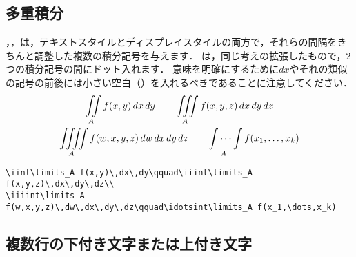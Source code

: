\subsection{多重積分}

，，は，テキストスタイルとディスプレイスタイルの両方で，それらの間隔をきちんと調整した複数の積分記号を与えます．
は，同じ考えの拡張したもので，2つの積分記号の間にドット入れます．
意味を明確にするために$dx$やそれの類似の記号の前後には小さい空白（\cn{,}）を入れるべきであることに注意してください．
\begin{gather}
\iint\limits_A f(x,y)\,dx\,dy\qquad\iiint\limits_A
f(x,y,z)\,dx\,dy\,dz\\
\iiiint\limits_A
f(w,x,y,z)\,dw\,dx\,dy\,dz\qquad\idotsint\limits_A f(x_1,\dots,x_k)
\end{gather}
\begin{verbatim}
\iint\limits_A f(x,y)\,dx\,dy\qquad\iiint\limits_A
f(x,y,z)\,dx\,dy\,dz\\
\iiiint\limits_A
f(w,x,y,z)\,dw\,dx\,dy\,dz\qquad\idotsint\limits_A f(x_1,\dots,x_k)
\end{verbatim}

\subsection{複数行の下付き文字または上付き文字}

